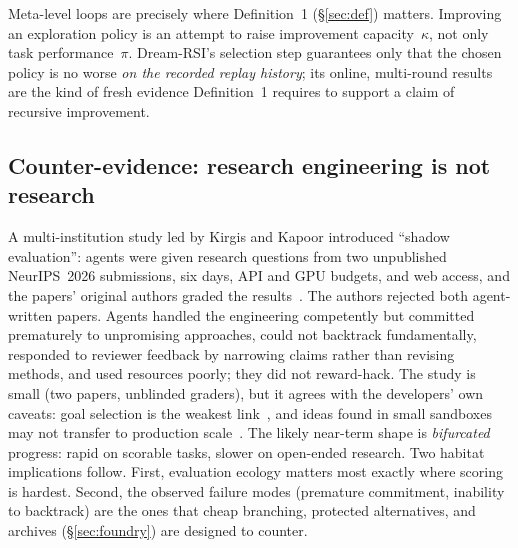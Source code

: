 \documentclass[11pt,a4paper]{article}
\begin{document}
Meta-level loops are precisely where Definition~1 (\S\ref{sec:def}) matters. Improving an exploration policy is an attempt to raise improvement capacity~$\kappa$, not only task performance~$\pi$. Dream-RSI's selection step guarantees only that the chosen policy is no worse \emph{on the recorded replay history}; its online, multi-round results are the kind of fresh evidence Definition~1 requires to support a claim of recursive improvement.

\subsection{Counter-evidence: research engineering is not research}\label{sec:counter}
A multi-institution study led by Kirgis and Kapoor introduced ``shadow evaluation'': agents were given research questions from two unpublished NeurIPS~2026 submissions, six days, API and GPU budgets, and web access, and the papers' original authors graded the results~\cite{kirgis2026shadow,mittr2026}. The authors rejected both agent-written papers. Agents handled the engineering competently but committed prematurely to unpromising approaches, could not backtrack fundamentally, responded to reviewer feedback by narrowing claims rather than revising methods, and used resources poorly; they did not reward-hack. The study is small (two papers, unblinded graders), but it agrees with the developers' own caveats: goal selection is the weakest link~\cite{anthropic2026rsi}, and ideas found in small sandboxes may not transfer to production scale~\cite{wen2026aar}. The likely near-term shape is \emph{bifurcated} progress: rapid on scorable tasks, slower on open-ended research. Two habitat implications follow. First, evaluation ecology matters most exactly where scoring is hardest. Second, the observed failure modes (premature commitment, inability to backtrack) are the ones that cheap branching, protected alternatives, and archives (\S\ref{sec:foundry}) are designed to counter.
\end{document}
